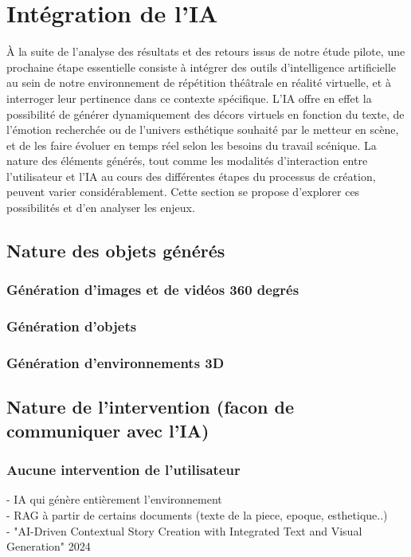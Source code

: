 \section{Intégration de l'IA}
À la suite de l’analyse des résultats et des retours issus de notre étude pilote, une prochaine étape 
essentielle consiste à intégrer des outils d’intelligence artificielle au sein de notre environnement
de répétition théâtrale en réalité virtuelle, et à interroger leur pertinence dans ce contexte spécifique.
L’IA offre en effet la possibilité de générer dynamiquement des décors virtuels en fonction du texte, 
de l’émotion recherchée ou de l’univers esthétique souhaité par le metteur en scène, et de les faire 
évoluer en temps réel selon les besoins du travail scénique. La nature des éléments générés, tout comme
les modalités d’interaction entre l’utilisateur et l’IA au cours des différentes étapes du processus de 
création, peuvent varier considérablement. Cette section se propose d’explorer ces possibilités et d’en 
analyser les enjeux.

\subsection{Nature des objets générés}
\subsubsection{Génération d'images et de vidéos 360 degrés}

\subsubsection{Génération d'objets}

\subsubsection{Génération d'environnements 3D}



\subsection{Nature de l'intervention (facon de communiquer avec l'IA)}
\subsubsection{Aucune intervention de l'utilisateur}
- IA qui génère entièrement l'environnement \\
- RAG à partir de certains documents (texte de la piece, epoque, esthetique..) \\
- "AI-Driven Contextual Story Creation with Integrated Text and Visual Generation" 2024

